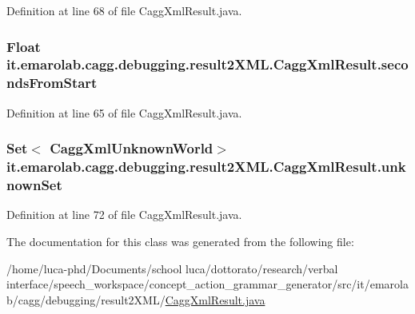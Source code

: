 Definition at line 68 of file Cagg\-Xml\-Result.\-java.

\hypertarget{classit_1_1emarolab_1_1cagg_1_1debugging_1_1result2XML_1_1CaggXmlResult_ae7e5180b0239b507853d4dfe8e6b6708}{
\subsubsection[{seconds\-From\-Start}]{\setlength{\rightskip}{0pt plus 5cm}Float it.\-emarolab.\-cagg.\-debugging.\-result2\-X\-M\-L.\-Cagg\-Xml\-Result.\-seconds\-From\-Start\hspace{0.3cm}{\ttfamily [private]}}}\label{classit_1_1emarolab_1_1cagg_1_1debugging_1_1result2XML_1_1CaggXmlResult_ae7e5180b0239b507853d4dfe8e6b6708}


Definition at line 65 of file Cagg\-Xml\-Result.\-java.

\hypertarget{classit_1_1emarolab_1_1cagg_1_1debugging_1_1result2XML_1_1CaggXmlResult_a473a71f574ff6e7a27f3b2338bc9eaa7}{
\subsubsection[{unknown\-Set}]{\setlength{\rightskip}{0pt plus 5cm}Set$<$ {\bf Cagg\-Xml\-Unknown\-World}$>$ it.\-emarolab.\-cagg.\-debugging.\-result2\-X\-M\-L.\-Cagg\-Xml\-Result.\-unknown\-Set\hspace{0.3cm}{\ttfamily [private]}}}\label{classit_1_1emarolab_1_1cagg_1_1debugging_1_1result2XML_1_1CaggXmlResult_a473a71f574ff6e7a27f3b2338bc9eaa7}


Definition at line 72 of file Cagg\-Xml\-Result.\-java.



The documentation for this class was generated from the following file\-:\begin{DoxyCompactItemize}
\item 
/home/luca-\/phd/\-Documents/school luca/dottorato/research/verbal interface/speech\-\_\-workspace/concept\-\_\-action\-\_\-grammar\-\_\-generator/src/it/emarolab/cagg/debugging/result2\-X\-M\-L/\hyperlink{CaggXmlResult_8java}{Cagg\-Xml\-Result.\-java}\end{DoxyCompactItemize}
